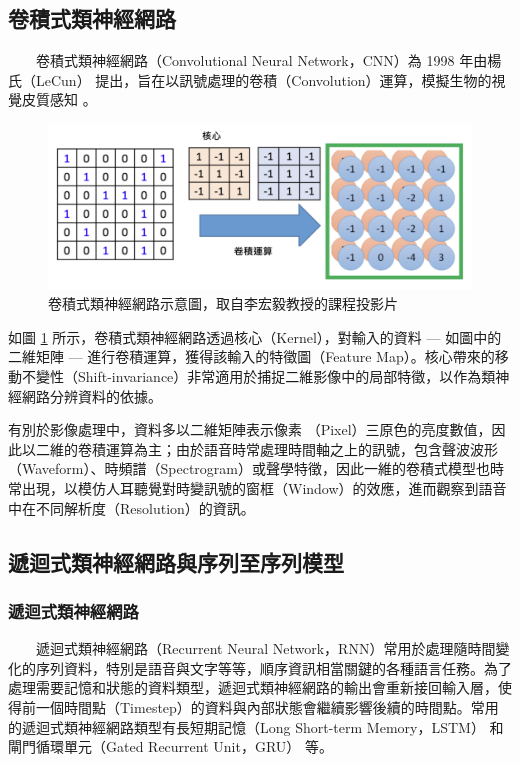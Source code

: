 \subsection{卷積式類神經網路}

　　卷積式類神經網路（Convolutional Neural Network，CNN）為 1998 年由楊氏（LeCun） \cite{lecun_gradient-based_1998} 提出，旨在以訊號處理的卷積（Convolution）運算，模擬生物的視覺皮質感知 \cite{hubel_receptive_1959} 。

\begin{figure}
    \centering
    \includegraphics[width=0.9\linewidth]{figures/cnnnew.png}
    \caption{卷積式類神經網路示意圖，取自李宏毅教授的課程投影片}
    \label{fig:cnn}
\end{figure}

        如圖 \ref{fig:cnn} 所示，卷積式類神經網路透過核心（Kernel），對輸入的資料 --- 如圖中的二維矩陣 --- 進行卷積運算，獲得該輸入的特徵圖（Feature Map）。核心帶來的移動不變性（Shift-invariance）非常適用於捕捉二維影像中的局部特徵，以作為類神經網路分辨資料的依據。

        有別於影像處理中，資料多以二維矩陣表示像素 （Pixel）三原色的亮度數值，因此以二維的卷積運算為主；由於語音時常處理時間軸之上的訊號，包含聲波波形（Waveform）、時頻譜（Spectrogram）或聲學特徵，因此一維的卷積式模型也時常出現，以模仿人耳聽覺對時變訊號的窗框（Window）的效應，進而觀察到語音中在不同解析度（Resolution）的資訊。

\subsection{遞迴式類神經網路與序列至序列模型}

\subsubsection{遞迴式類神經網路}

　　遞迴式類神經網路（Recurrent Neural Network，RNN）常用於處理隨時間變化的序列資料，特別是語音與文字等等，順序資訊相當關鍵的各種語言任務。為了處理需要記憶和狀態的資料類型，遞迴式類神經網路的輸出會重新接回輸入層，使得前一個時間點（Timestep）的資料與內部狀態會繼續影響後續的時間點。常用的遞迴式類神經網路類型有長短期記憶（Long Short-term Memory，LSTM）\cite{hochreiter1997long} 和閘門循環單元（Gated Recurrent Unit，GRU）\cite{cho-etal-2014-properties} 等。

